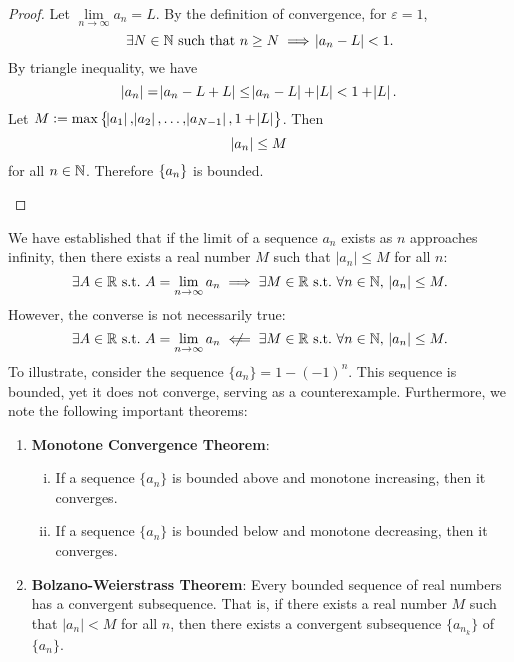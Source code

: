 \documentclass[11pt,openany]{article}
\begin{document}
\begin{proof}
	Let $\lim\limits_{n\to\infty}a_n=L$. By the definition of convergence, for $\varepsilon=1$,  \[
	\exists N\in\mathbb{N}\ \text{such that}\ n\geq N\implies\abs{a_n-L}<1.
	\] By triangle inequality, we have \[
	\abs{a_n}=\abs{a_n-L+L}\leq\abs{a_n-L}+\abs{L}<1+\abs{L}.
	\] Let $M:=\max\set{\abs{a_1},\abs{a_2},\dots,\abs{a_{N-1}},1+\abs{L}}$. Then \[
	\abs{a_n}\leq M
	\] for all $n\in\mathbb{N}$. Therefore $\set{a_n}$ is bounded.
\begin{center}
	
\end{center}
\end{proof}
\vfill
\begin{note}
	We have established that if the limit of a sequence \(a_n\) exists as \(n\) approaches infinity, then there exists a real number \(M\) such that \(\lvert a_n \rvert \leq M\) for all \(n\): \[
	\exists A\in\R\ \text{s.t.}\ A=\lim_{n\to\infty}a_n\implies\exists M\in\R\ \text{s.t.}\ \forall n\in\N,\ \abs{a_n}\leq M.
	\]However, the converse is not necessarily true: \[
	\exists A\in\R\ \text{s.t.}\ A=\lim_{n\to\infty}a_n\centernot\impliedby\exists M\in\R\ \text{s.t.}\ \forall n\in\N,\ \abs{a_n}\leq M.
	\] To illustrate, consider the sequence \(\{a_n\} = 1 - (-1)^n\). This sequence is bounded, yet it does not converge, serving as a counterexample.
	\vfill
	\noindent Furthermore, we note the following important theorems:
	\begin{enumerate}
		\item \textbf{Monotone Convergence Theorem}:
		\begin{enumerate}[(i)]
			\item If a sequence \(\{a_n\}\) is bounded above and monotone increasing, then it converges.
			\item If a sequence \(\{a_n\}\) is bounded below and monotone decreasing, then it converges.
		\end{enumerate}
		\item \textbf{Bolzano-Weierstrass Theorem}: Every bounded sequence of real numbers has a convergent subsequence. That is, if there exists a real number \(M\) such that \(\lvert a_n \rvert < M\) for all \(n\), then there exists a convergent subsequence \(\{a_{n_k}\}\) of \(\{a_n\}\).
	\end{enumerate}
\end{note}
\end{document}
